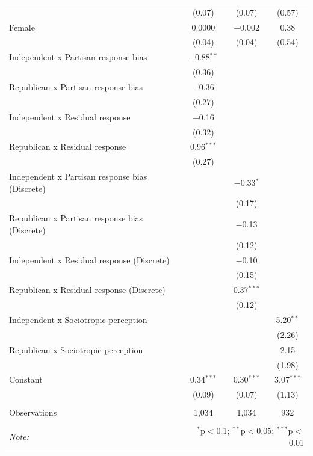 \documentclass{article}\usepackage[]{graphicx}\usepackage[]{xcolor}
\begin{document}
\begin{table}[H]
\begin{tabular}{@{\extracolsep{5pt}}lccc}
  & (0.07) & (0.07) & (0.57) \\ 
  Female & 0.0000 & $-$0.002 & 0.38 \\ 
  & (0.04) & (0.04) & (0.54) \\ 
  Independent x Partisan response bias & $-$0.88$^{**}$ &  &  \\ 
  & (0.36) &  &  \\ 
  Republican x Partisan response bias & $-$0.36 &  &  \\ 
  & (0.27) &  &  \\ 
  Independent x Residual response & $-$0.16 &  &  \\ 
  & (0.32) &  &  \\ 
  Republican x Residual response & 0.96$^{***}$ &  &  \\ 
  & (0.27) &  &  \\ 
  Independent x Partisan response bias (Discrete) &  & $-$0.33$^{*}$ &  \\ 
  &  & (0.17) &  \\ 
  Republican x Partisan response bias (Discrete) &  & $-$0.13 &  \\ 
  &  & (0.12) &  \\ 
  Independent x Residual response (Discrete) &  & $-$0.10 &  \\ 
  &  & (0.15) &  \\ 
  Republican x Residual response (Discrete) &  & 0.37$^{***}$ &  \\ 
  &  & (0.12) &  \\ 
  Independent x Sociotropic perception &  &  & 5.20$^{**}$ \\ 
  &  &  & (2.26) \\ 
  Republican x Sociotropic perception &  &  & 2.15 \\ 
  &  &  & (1.98) \\ 
  Constant & 0.34$^{***}$ & 0.30$^{***}$ & 3.07$^{***}$ \\ 
  & (0.09) & (0.07) & (1.13) \\ 
 \hline \\[-1.8ex] 
Observations & 1,034 & 1,034 & 932 \\ 
\hline 
\hline \\[-1.8ex] 
\textit{Note:}  & \multicolumn{3}{r}{$^{*}$p$<$0.1; $^{**}$p$<$0.05; $^{***}$p$<$0.01} \\ 
\end{tabular} 
\endgroup 

\end{table}
\end{document}
